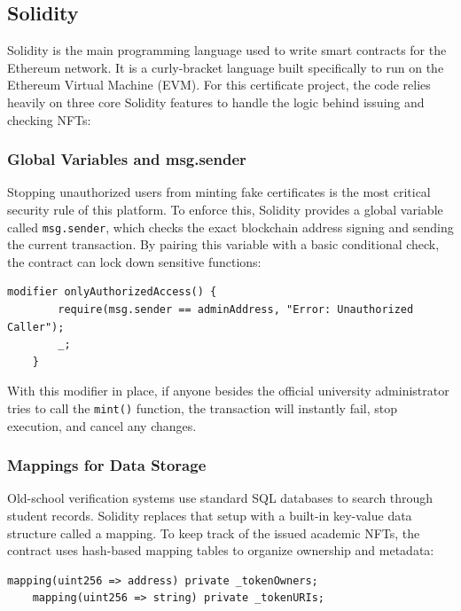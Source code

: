 \subsection{Solidity}

Solidity is the main programming language used to write smart contracts for the Ethereum network. It is a curly-bracket language built specifically to run on the Ethereum Virtual Machine (EVM)\cite{onlinev0835web}. For this certificate project, the code relies heavily on three core Solidity features to handle the logic behind issuing and checking NFTs:

\subsubsection{Global Variables and msg.sender}

Stopping unauthorized users from minting fake certificates is the most critical security rule of this platform. To enforce this, Solidity provides a global variable called \texttt{msg.sender}, which checks the exact blockchain address signing and sending the current transaction\cite{onlinev0835web}. By pairing this variable with a basic conditional check, the contract can lock down sensitive functions:

\noindent
\begin{lstlisting}[language=solidity,style=codeStyle]
    modifier onlyAuthorizedAccess() {
        require(msg.sender == adminAddress, "Error: Unauthorized Caller");
        _;
    }
\end{lstlisting}

With this modifier in place, if anyone besides the official university administrator tries to call the \texttt{mint()} function, the transaction will instantly fail, stop execution, and cancel any changes.

\subsubsection{Mappings for Data Storage}

Old-school verification systems use standard SQL databases to search through student records. Solidity replaces that setup with a built-in key-value data structure called a mapping\cite{onlinev0835web}. To keep track of the issued academic NFTs, the contract uses hash-based mapping tables to organize ownership and metadata:

\noindent
\begin{lstlisting}[language=solidity,style=codeStyle]
    mapping(uint256 => address) private _tokenOwners;
    mapping(uint256 => string) private _tokenURIs;
\end{lstlisting}


